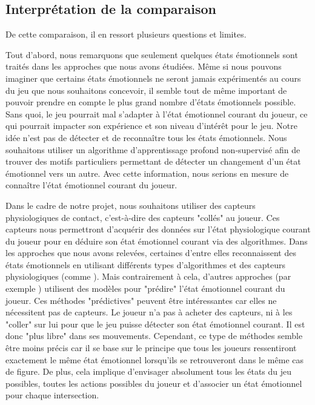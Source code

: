 \documentclass[11pt]{article}
\begin{document}
	\subsection{Interprétation de la comparaison}
        De cette comparaison, il en ressort plusieurs questions et limites.\par
		Tout d'abord, nous remarquons que seulement quelques états émotionnels sont traités dans les approches que nous avons étudiées.
		Même si nous pouvons imaginer que certains états émotionnels ne seront jamais expérimentés au cours du jeu que nous souhaitons concevoir, il semble tout de même important de pouvoir prendre en compte le plus grand nombre d'états émotionnels possible.
		Sans quoi, le jeu pourrait mal s'adapter à l'état émotionnel courant du joueur, ce qui pourrait impacter son expérience et son niveau d'intérêt pour le jeu.
		Notre idée n'est pas de détecter et de reconnaître tous les états émotionnels.
		Nous souhaitons utiliser un algorithme d'apprentissage profond non-supervisé afin de trouver des motifs particuliers permettant de détecter un changement d'un état émotionnel vers un autre.
		Avec cette information, nous serions en mesure de connaître l'état émotionnel courant du joueur.\par
		Dans le cadre de notre projet, nous souhaitons utiliser des capteurs physiologiques de contact, c'est-à-dire des capteurs "collés" au joueur.
		Ces capteurs nous permettront d'acquérir des données sur l'état physiologique courant du joueur pour en déduire son état émotionnel courant via des algorithmes.
		Dans les approches que nous avons relevées, certaines d'entre elles reconnaissent des états émotionnels en utilisant différents types d'algorithmes et des capteurs physiologiques (comme \cite{carofiglio_et_al._2019,gal_2019,gal_et_al._2020,gizycka_et_al._2018,maier_et_al._2019,nalepa_et_al._2017,yang_et_al._2018,yannakakis_et_al._2009}).
		Mais contrairement à cela, d'autres approches (par exemple \cite{Mostefai_et_al._2019}) utilisent des modèles pour "prédire" l'état émotionnel courant du joueur.
		Ces méthodes "prédictives" peuvent être intéressantes car elles ne nécessitent pas de capteurs.
		Le joueur n'a pas à acheter des capteurs, ni à les "coller" sur lui pour que le jeu puisse détecter son état émotionnel courant.
		Il est donc "plus libre" dans ses mouvements.
		Cependant, ce type de méthodes semble être moins précis car il se base sur le principe que tous les joueurs ressentiront exactement le même état émotionnel lorsqu'ils se retrouveront dans le même cas de figure.
		De plus, cela implique d'envisager absolument tous les états du jeu possibles, toutes les actions possibles du joueur et d'associer un état émotionnel pour chaque intersection.
\end{document}
